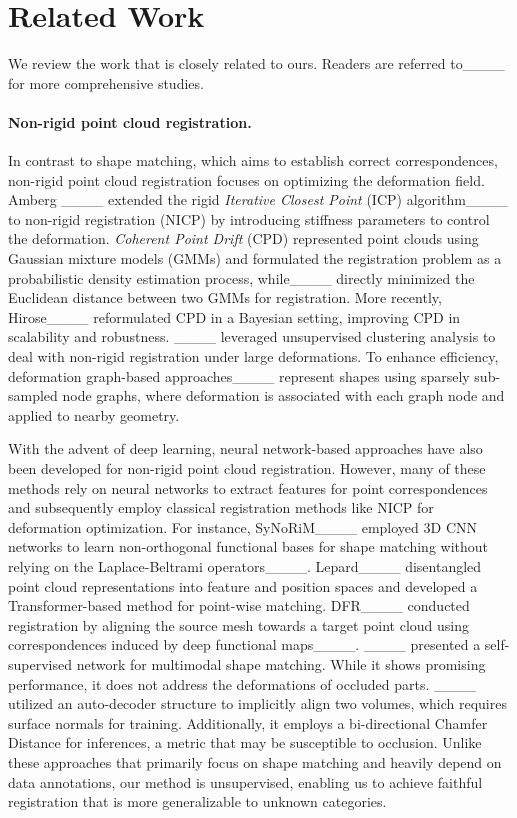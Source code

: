\section{Related Work}
We review the work that is closely related to ours. Readers are referred to____ for more comprehensive studies.


\paragraph{Non-rigid point cloud registration.} In contrast to shape matching, which aims to establish correct correspondences, non-rigid point cloud registration focuses on optimizing the deformation field. Amberg \etal____ extended the rigid \emph{Iterative Closest Point} (ICP) algorithm____ to non-rigid registration (NICP) by introducing stiffness parameters to control the deformation. \emph{Coherent Point Drift} (CPD) represented point clouds using Gaussian mixture models (GMMs) and formulated the registration problem as a probabilistic density estimation process, while____ directly minimized the Euclidean distance between two GMMs for registration. More recently, Hirose____ reformulated CPD in a Bayesian setting, improving CPD in scalability and robustness. ____ leveraged unsupervised clustering analysis to deal with non-rigid registration under large deformations. To enhance efficiency, deformation graph-based approaches____ represent shapes using sparsely sub-sampled node graphs, where deformation is associated with each graph node and applied to nearby geometry. 


With the advent of deep learning, neural network-based approaches have also been developed for non-rigid point cloud registration. 
However, many of these methods rely on neural networks to extract features for point correspondences and subsequently employ classical registration methods like NICP for deformation optimization. For instance,   SyNoRiM____ employed 3D CNN networks to learn non-orthogonal functional bases for shape matching without relying on the Laplace-Beltrami operators____. Lepard____ disentangled point cloud representations into feature and position spaces and developed a Transformer-based method for point-wise matching. DFR____ conducted registration by aligning the source mesh towards a target point cloud using correspondences induced by deep functional maps____. ____ presented a self-supervised network for multimodal shape matching. While it shows promising performance, it does not address the deformations of occluded parts. ____ utilized an auto-decoder structure to implicitly align two volumes, which requires surface normals for training. Additionally, it employs a bi-directional Chamfer Distance for inferences, a metric that may be susceptible to occlusion. Unlike these approaches that primarily focus on shape matching and heavily depend on data annotations, our method is unsupervised, enabling us to achieve faithful registration that is more generalizable to unknown categories. 






